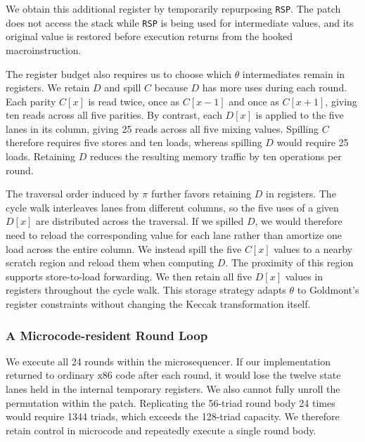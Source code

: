 \documentclass[journal=tches,submission]{iacrtrans}
\newcommand{\code}[1]{\texttt{#1}}
\begin{document}
We obtain this additional register by temporarily repurposing \code{RSP}.
The patch does not access the stack while \code{RSP} is being used for intermediate values, and its original value is restored before execution returns from the hooked macroinstruction.

The register budget also requires us to choose which $\theta$ intermediates remain in registers. 
We retain $D$ and spill $C$ because $D$ has more uses during each round. 
Each parity $C[x]$ is read twice, once as $C[x-1]$ and once as $C[x+1]$, giving ten reads across all five parities. 
By contrast, each $D[x]$ is applied to the five lanes in its column, giving 25 reads across all five mixing values. 
Spilling $C$ therefore requires five stores and ten loads, whereas spilling $D$ would require 25 loads. 
Retaining $D$ reduces the resulting memory traffic by ten operations per round.

The traversal order induced by $\pi$ further favors retaining $D$ in registers. 
The cycle walk interleaves lanes from different columns, so the five uses of a given $D[x]$ are distributed across the traversal. 
If we spilled $D$, we would therefore need to reload the corresponding value for each lane rather than amortize one load across the entire column. 
We instead spill the five $C[x]$ values to a nearby scratch region and reload them when computing $D$. 
The proximity of this region supports store-to-load forwarding. 
We then retain all five $D[x]$ values in registers throughout the cycle walk. 
This storage strategy adapts $\theta$ to Goldmont’s register constraints without changing the Keccak transformation itself.


\subsubsection{A Microcode-resident Round Loop}
\label{sec:loop}

We execute all 24 rounds within the microsequencer. 
If our implementation returned to ordinary x86 code after each round, it would lose the twelve state lanes held in the internal temporary registers. 
We also cannot fully unroll the permutation within the patch. 
Replicating the 56-triad round body 24 times would require 1344 triads, which exceeds the 128-triad capacity. 
We therefore retain control in microcode and repeatedly execute a single round body.
\end{document}

